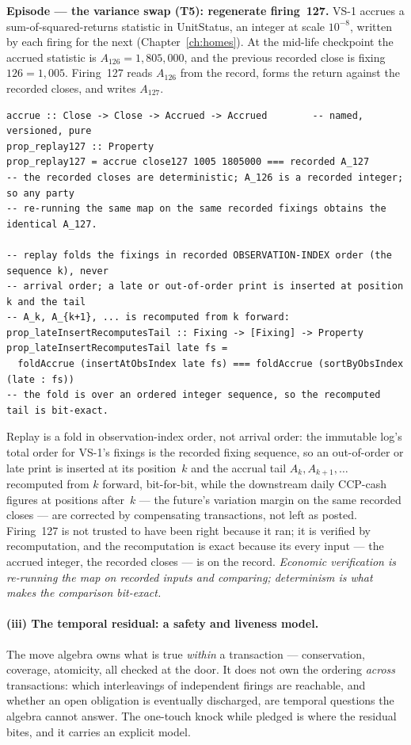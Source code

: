\medskip\noindent\textbf{Episode --- the variance swap (T5): regenerate firing~127.}
VS-1 accrues a sum-of-squared-returns statistic in UnitStatus, an integer at scale $10^{-8}$,
written by each firing for the next (Chapter~\ref{ch:homes}). At the mid-life checkpoint the
accrued statistic is $A_{126} = 1{,}805{,}000$, and the previous recorded close is fixing
$126 = 1{,}005$. Firing~127 reads $A_{126}$ from the record, forms the return against the
recorded closes, and writes $A_{127}$.

\begin{lstlisting}
accrue :: Close -> Close -> Accrued -> Accrued        -- named, versioned, pure
prop_replay127 :: Property
prop_replay127 = accrue close127 1005 1805000 === recorded A_127
-- the recorded closes are deterministic; A_126 is a recorded integer; so any party
-- re-running the same map on the same recorded fixings obtains the identical A_127.

-- replay folds the fixings in recorded OBSERVATION-INDEX order (the sequence k), never
-- arrival order; a late or out-of-order print is inserted at position k and the tail
-- A_k, A_{k+1}, ... is recomputed from k forward:
prop_lateInsertRecomputesTail :: Fixing -> [Fixing] -> Property
prop_lateInsertRecomputesTail late fs =
  foldAccrue (insertAtObsIndex late fs) === foldAccrue (sortByObsIndex (late : fs))
-- the fold is over an ordered integer sequence, so the recomputed tail is bit-exact.
\end{lstlisting}

Replay is a fold in observation-index order, not arrival order: the immutable log's total
order for VS-1's fixings is the recorded fixing sequence, so an out-of-order or late print
is inserted at its position~$k$ and the accrual tail $A_{k},A_{k+1},\dots$ recomputed from
$k$ forward, bit-for-bit, while the downstream daily CCP-cash figures at positions after~$k$
--- the future's variation margin on the same recorded closes --- are corrected by
compensating transactions, not left as posted. Firing~127 is not trusted to have been right
because it ran; it is verified by recomputation, and the recomputation is exact because its
every input --- the accrued integer, the recorded closes --- is on the record.
\emph{Economic verification is re-running the map on recorded inputs and comparing;
determinism is what makes the comparison bit-exact.}

\paragraph{(iii) The temporal residual: a safety and liveness model.}
The move algebra owns what is true \emph{within} a transaction --- conservation, coverage,
atomicity, all checked at the door. It does not own the ordering \emph{across} transactions:
which interleavings of independent firings are reachable, and whether an open obligation is
eventually discharged, are temporal questions the algebra cannot answer. The one-touch knock
while pledged is where the residual bites, and it carries an explicit model.

